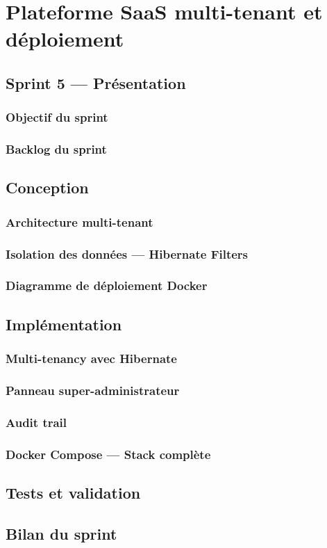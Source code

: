\chapter{Plateforme SaaS multi-tenant et déploiement}

\section{Sprint 5 — Présentation}

\subsection{Objectif du sprint}
\subsection{Backlog du sprint}

\section{Conception}

\subsection{Architecture multi-tenant}
\subsection{Isolation des données — Hibernate Filters}
\subsection{Diagramme de déploiement Docker}

\section{Implémentation}

\subsection{Multi-tenancy avec Hibernate}
\subsection{Panneau super-administrateur}
\subsection{Audit trail}
\subsection{Docker Compose — Stack complète}

\section{Tests et validation}

\section*{Bilan du sprint}
